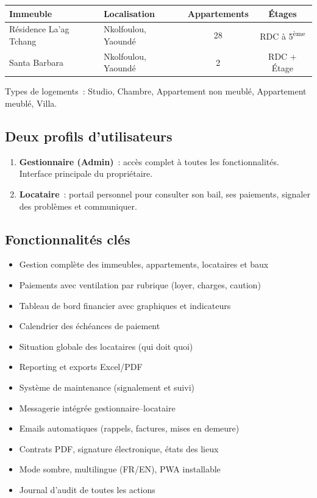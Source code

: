 \documentclass[12pt,a4paper]{article}
\begin{document}
\begin{tabularx}{\textwidth}{lXcc}
\toprule
\textbf{Immeuble} & \textbf{Localisation} & \textbf{Appartements} & \textbf{\'Etages} \\
\midrule
R\'esidence La'ag Tchang & Nkolfoulou, Yaound\'e & 28 & RDC \`a 5\textsuperscript{\`eme} \\
Santa Barbara & Nkolfoulou, Yaound\'e & 2 & RDC + \'Etage \\
\bottomrule
\end{tabularx}

\vspace{0.3cm}
Types de logements~: Studio, Chambre, Appartement non meubl\'e, Appartement meubl\'e, Villa.

\subsection{Deux profils d'utilisateurs}

\begin{enumerate}[leftmargin=2cm]
\item[\faUserShield] \textbf{Gestionnaire (Admin)}~: acc\`es complet \`a toutes les fonctionnalit\'es. Interface principale du propri\'etaire.
\item[\faUser] \textbf{Locataire}~: portail personnel pour consulter son bail, ses paiements, signaler des probl\`emes et communiquer.
\end{enumerate}

\subsection{Fonctionnalit\'es cl\'es}

\begin{itemize}
\item Gestion compl\`ete des immeubles, appartements, locataires et baux
\item Paiements avec ventilation par rubrique (loyer, charges, caution)
\item Tableau de bord financier avec graphiques et indicateurs
\item Calendrier des \'ech\'eances de paiement
\item Situation globale des locataires (qui doit quoi)
\item Reporting et exports Excel/PDF
\item Syst\`eme de maintenance (signalement et suivi)
\item Messagerie int\'egr\'ee gestionnaire--locataire
\item Emails automatiques (rappels, factures, mises en demeure)
\item Contrats PDF, signature \'electronique, \'etats des lieux
\item Mode sombre, multilingue (FR/EN), PWA installable
\item Journal d'audit de toutes les actions
\end{itemize}
\end{document}
